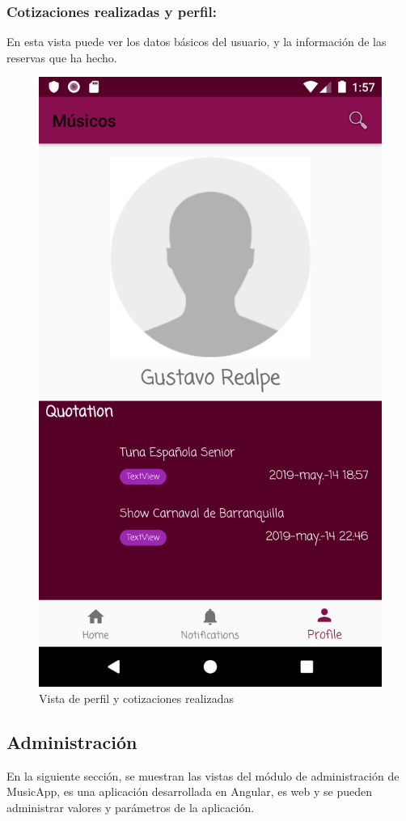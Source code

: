 \subsubsection{Cotizaciones realizadas y perfil:}
En esta vista puede ver los datos básicos del usuario, y la información de las reservas que ha hecho.
\begin{figure}[hbt!]
 \centering
\includegraphics[width=0.6\linewidth]{Desarrollo/Interfaces/Interfaces/imgs/profile.png}
\caption{Vista de perfil y cotizaciones realizadas}
\end{figure}
\newpage


\subsection{Administración}
En la siguiente sección, se muestran las vistas del módulo de administración de MusicApp, es una aplicación desarrollada en Angular, es web y se pueden administrar valores y parámetros de la aplicación.
